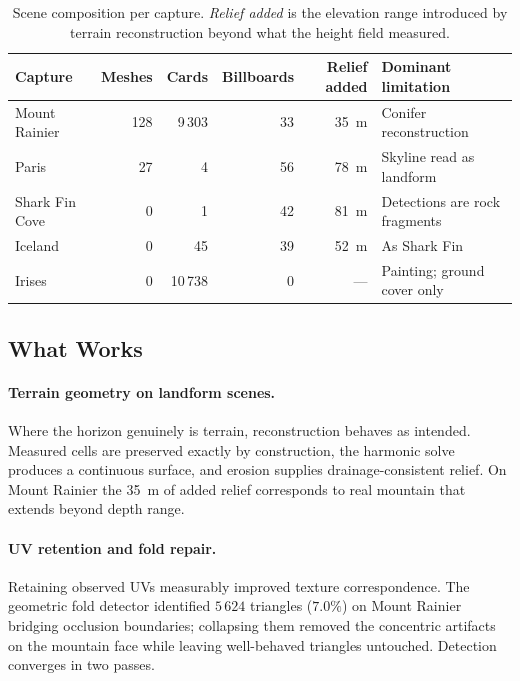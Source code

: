 \begin{table}[t]
\centering
\small
\caption{Scene composition per capture. \emph{Relief added} is the elevation range
introduced by terrain reconstruction beyond what the height field measured.}
\label{tab:results}
\begin{tabular}{@{}lrrrrl@{}}
\toprule
\textbf{Capture} & \textbf{Meshes} & \textbf{Cards} & \textbf{Billboards} &
\textbf{Relief added} & \textbf{Dominant limitation} \\
\midrule
Mount Rainier   & 128 & 9\,303 & 33 & \SI{35}{\meter} & Conifer reconstruction \\
Paris           & 27  & 4      & 56 & \SI{78}{\meter} & Skyline read as landform \\
Shark Fin Cove  & 0   & 1      & 42 & \SI{81}{\meter} & Detections are rock fragments \\
Iceland         & 0   & 45     & 39 & \SI{52}{\meter} & As Shark Fin \\
Irises          & 0   & 10\,738 & 0 & --- & Painting; ground cover only \\
\bottomrule
\end{tabular}
\end{table}

\subsection{What Works}

\paragraph{Terrain geometry on landform scenes.}
Where the horizon genuinely is terrain, reconstruction behaves as intended.
Measured cells are preserved exactly by construction, the harmonic solve produces
a continuous surface, and erosion supplies drainage-consistent relief. On Mount
Rainier the \SI{35}{\meter} of added relief corresponds to real mountain that
extends beyond depth range.

\paragraph{UV retention and fold repair.}
Retaining observed UVs measurably improved texture correspondence. The geometric
fold detector identified $5\,624$ triangles ($7.0\%$) on Mount Rainier bridging
occlusion boundaries; collapsing them removed the concentric artifacts on the
mountain face while leaving well-behaved triangles untouched. Detection converges
in two passes.

